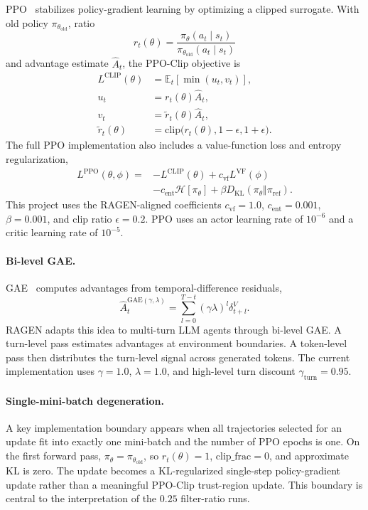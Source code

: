 PPO~\citep{schulman2017ppo} stabilizes policy-gradient learning by optimizing a clipped surrogate. With old policy \(\pi_{\theta_{\mathrm{old}}}\), ratio
\begin{equation}
r_t(\theta) =
\frac{\pi_\theta(a_t \mid s_t)}
{\pi_{\theta_{\mathrm{old}}}(a_t \mid s_t)}
\end{equation}
and advantage estimate \(\hat{A}_t\), the PPO-Clip objective is
\begin{align}
L^{\mathrm{CLIP}}(\theta)
&= \mathbb{E}_t\left[\min(u_t, v_t)\right], \\
u_t &= r_t(\theta)\hat{A}_t, \\
v_t &= \tilde{r}_t(\theta)\hat{A}_t, \\
\tilde{r}_t(\theta)
&= \mathrm{clip}\bigl(r_t(\theta),1-\epsilon,1+\epsilon\bigr).
\end{align}
The full PPO implementation also includes a value-function loss and entropy regularization,
\begin{equation}
\begin{aligned}
L^{\mathrm{PPO}}(\theta,\phi)
= {}& -L^{\mathrm{CLIP}}(\theta)
+ c_{\mathrm{vf}}L^{\mathrm{VF}}(\phi) \\
&- c_{\mathrm{ent}}\mathcal{H}[\pi_\theta]
+ \beta D_{\mathrm{KL}}(\pi_\theta\Vert\pi_{\mathrm{ref}}).
\end{aligned}
\end{equation}
This project uses the RAGEN-aligned coefficients \(c_{\mathrm{vf}}=1.0\), \(c_{\mathrm{ent}}=0.001\), \(\beta=0.001\), and clip ratio \(\epsilon=0.2\). PPO uses an actor learning rate of \(10^{-6}\) and a critic learning rate of \(10^{-5}\).

\paragraph{Bi-level GAE.}
GAE~\citep{schulman2016gae} computes advantages from temporal-difference residuals,
\begin{equation}
\hat{A}_t^{\mathrm{GAE}(\gamma,\lambda)}
= \sum_{l=0}^{T-t}(\gamma\lambda)^l \delta_{t+l}^{V}.
\end{equation}
RAGEN adapts this idea to multi-turn LLM agents through bi-level GAE. A turn-level pass estimates advantages at environment boundaries. A token-level pass then distributes the turn-level signal across generated tokens. The current implementation uses \(\gamma=1.0\), \(\lambda=1.0\), and high-level turn discount \(\gamma_{\mathrm{turn}}=0.95\).

\paragraph{Single-mini-batch degeneration.}
A key implementation boundary appears when all trajectories selected for an update fit into exactly one mini-batch and the number of PPO epochs is one. On the first forward pass, \(\pi_\theta=\pi_{\theta_{\mathrm{old}}}\), so \(r_t(\theta)=1\), \(\mathrm{clip\_frac}=0\), and approximate KL is zero. The update becomes a KL-regularized single-step policy-gradient update rather than a meaningful PPO-Clip trust-region update. This boundary is central to the interpretation of the \(0.25\) filter-ratio runs.

